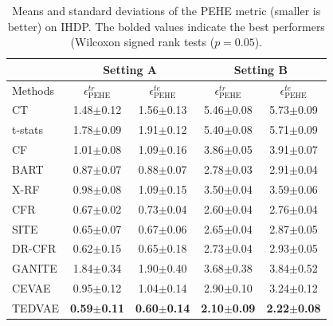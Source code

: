 \documentclass[letterpaper]{article} %
\begin{document}
\begin{table}[!t]
	\centering		
	\setlength{\tabcolsep}{3pt}
	\begin{tabular}{l | c c | c c }
		\hline
		& \multicolumn{2}{c|}{Setting A} & \multicolumn{2}{c}{Setting B}\\
		\hline
		Methods & $\epsilon_{\text{PEHE}}^{tr}$ & $\epsilon_{\text{PEHE}}^{te}$ & $\epsilon_{\text{PEHE}}^{tr}$ & $\epsilon_{\text{PEHE}}^{te}$ \\
		\hline
		CT &  1.48$\pm$0.12 & 1.56$\pm$0.13 & 5.46$\pm$0.08 & 5.73$\pm$0.09\\				
		t-stats &  1.78$\pm$0.09 & 1.91$\pm$0.12 & 5.40$\pm$0.08 & 5.71$\pm$0.09\\
		\hline
		CF	& 1.01$\pm$0.08 & 1.09$\pm$0.16 & 3.86$\pm$0.05 & 3.91$\pm$0.07\\
		BART & 0.87$\pm$0.07 & 0.88$\pm$0.07 & 2.78$\pm$0.03 & 2.91$\pm$0.04\\
		X-RF & 0.98$\pm$0.08 & 1.09$\pm$0.15 & 3.50$\pm$0.04 & 3.59$\pm$0.06  \\
		\hline
		CFR	 & 0.67$\pm$0.02 & 0.73$\pm$0.04 & 2.60$\pm$0.04 & 2.76$\pm$0.04 \\
		
		SITE & 0.65$\pm$0.07 & 0.67$\pm$0.06 & 2.65$\pm$0.04 & 2.87$\pm$0.05 \\
		DR-CFR  & 0.62$\pm$0.15 & 0.65$\pm$0.18 & 2.73$\pm$0.04 & 2.93$\pm$0.05\\
		\hline	
		GANITE & 1.84$\pm$0.34 & 1.90$\pm$0.40 & 3.68$\pm$0.38 & 3.84$\pm$0.52\\
		CEVAE & 0.95$\pm$0.12 & 1.04$\pm$0.14 & 2.90$\pm$0.10 & 3.24$\pm$0.12\\
		TEDVAE & \textbf{0.59$\pm$0.11} & \textbf{0.60$\pm$0.14} & \textbf{2.10$\pm$0.09} & \textbf{2.22$\pm$0.08} \\
		\hline
	\end{tabular}
	\caption{Means and standard deviations of the PEHE metric (smaller is better) on IHDP. The bolded values indicate the best performers (Wilcoxon signed rank tests ($p=0.05$).}
	\label{IHDP}
\end{table}
\end{document}

